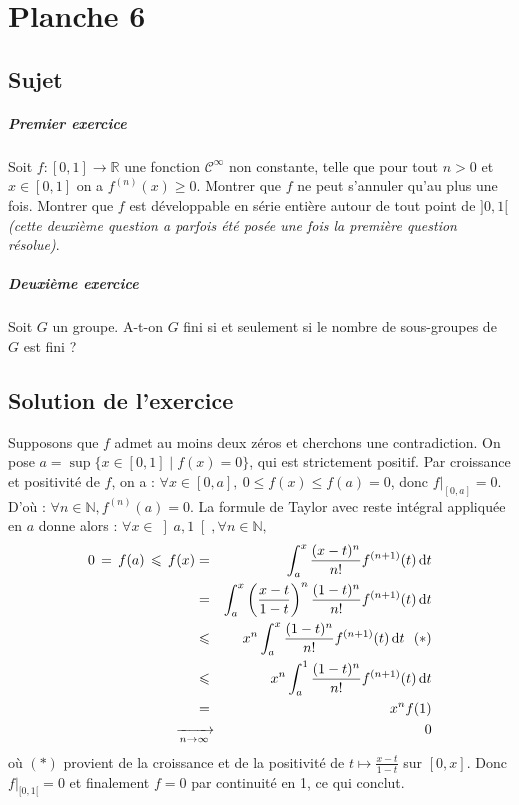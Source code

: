 \chapter{Planche 6}

\section{Sujet}


\paragraph{Premier exercice}
Soit $f : [0, 1] \rightarrow  \mathbb{R}$ une fonction $\mathcal{C}^{\infty }$ non constante, telle que pour tout $n > 0$ et $x \in [0, 1]$ on a $f^{(n)}(x) \geqslant  0$. Montrer que $f$ ne peut s'annuler qu'au plus une fois. Montrer que $f$ est développable en série entière autour de tout point de $]0, 1[$ \emph{(cette deuxième question a parfois été posée une fois la première question résolue)}.

\paragraph{Deuxième exercice}
Soit $G$ un groupe. A-t-on $G$ fini si et seulement si le nombre de sous-groupes de $G$ est fini ?

\section{Solution de l'exercice} %

Supposons que $f$ admet au moins deux zéros et cherchons une contradiction. On pose $a = \sup \{x\in  [0,1] \mid f(x) = 0 \}$, qui est strictement positif. Par croissance et positivité de $f$, on a : $\forall x\in [0,a],\ 0\leqslant f(x)\leqslant f(a)=0$, donc $f|_{[0,a]} = 0$. D'où : $\forall n\in \mathbb{N}, f^{(n)} (a) = 0$. La formule de Taylor avec reste intégral appliquée en $a$ donne alors : $\forall  x \in  \left]a,1\right[, \forall  n\in \mathbb{N},$
\begin{eqnarray*}
0 \,=\, f(a) \,\leqslant \, f(x) &=& \int _{a} ^{x} \frac{(x-t)^{n} }{n!} f^{(n+1)}(t) \,\mathrm{d}t\\
&=& \int _{a} ^{x} \left( \frac{x-t}{1-t} \right)^{n} \frac{(1-t)^{n} }{n!} f^{(n+1)}(t) \,\mathrm{d}t\\
&\leqslant & x^{n} \int _{a} ^{x} \frac{(1-t)^{n} }{n!} f^{(n+1)}(t) \,\mathrm{d}t \ \ (*)\\
&\leqslant & x^{n} \int _{a} ^{1} \frac{(1-t)^{n} }{n!} f^{(n+1)}(t) \,\mathrm{d}t\\
&=& x^{n} f(1) \\
&\text{\makebox[0mm]{$\xrightarrow[n\rightarrow\infty]{}$}} & \ \ 0
\end{eqnarray*}
où $(*)$ provient de la croissance et de la positivité de $t\mapsto\frac{x-t}{1-t}$ sur $[0,x]$. Donc $f|_{[0,1[} =0$ et finalement $f=0$ par continuité en 1, ce qui conclut.

